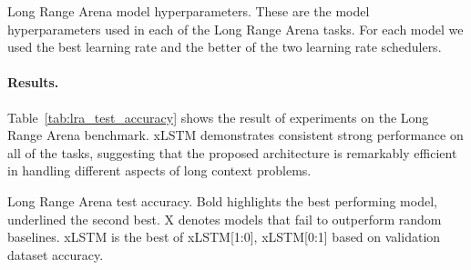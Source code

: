 \documentclass[dvipsnames]{article}
\begin{document}
\begin{appendix}

\begin{table}
    \centering
    

    \vspace{0.1cm}
    
    \caption{Long Range Arena model hyperparameters. These are the model hyperparameters used in each of the Long Range Arena tasks. For each model we used the best learning rate and the better of the two learning rate schedulers.
    }
    \vspace{0.1cm}
    
    \label{tab:lra_hyperparameters}
\end{table}
% 

\paragraph{Results.}
Table~\ref{tab:lra_test_accuracy} shows the result of experiments on the Long Range Arena benchmark. 
xLSTM demonstrates consistent strong performance on all of the tasks, suggesting that the proposed architecture is remarkably efficient in handling different aspects of long context problems.
\begin{table}
    \centering
    \begin{adjustbox}{width=1.0\textwidth}
    
    \end{adjustbox}
    \vspace{0.1cm}
    
    \caption{Long Range Arena test accuracy. Bold highlights the best performing model, underlined the second best. X denotes models that fail to outperform random baselines. xLSTM is the best of xLSTM[1:0], xLSTM[0:1] based on validation dataset accuracy.
    }
    \vspace{0.1cm}
    

\end{table}
\end{appendix}
\end{document}
